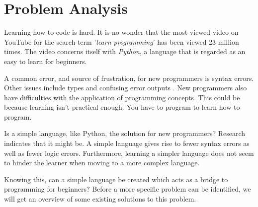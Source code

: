 \chapter{Problem Analysis} \label{chap:analysis}
Learning how to code is hard.
It is no wonder that the most viewed video on YouTube for the search term '\textit{learn programming}' has been viewed 23 million times\cite{LearnProgrammingYouTube}.
The video concerns itself with \textit{Python}, a language that is regarded as an easy to learn for beginners\cite{PythonBeginners}.

A common error, and source of frustration, for new programmers is syntax errors.
Other issues include types and confusing error outputs \cite{bosseWhyProgrammingDifficult2017}.
New programmers also have difficulties with the application of programming concepts.
This could be because learning isn't practical enough\cite{lahtinenStudyDifficultiesNovice2005}.
You have to program to learn how to program.

Is a simple language, like Python\cite{WhatPythonExecutive}, the solution for new programmers?
Research indicates that it might be. A simple language gives rise to fewer syntax errors as well as fewer logic errors.
Furthermore, learning a simpler language does not seem to hinder the learner when moving to a more complex language\cite{mannilaWhatSimpleLanguage2006}.


Knowing this, can a simple language be created which acts as a bridge to programming for beginners?
Before a more specific problem can be identified, we will get an overview of some existing solutions to this problem.



